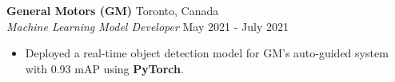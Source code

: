 \documentclass[a4paper]{article}
\begin{document}
\textbf{General Motors (GM)} \hfill Toronto, Canada\\
\textit{Machine Learning Model Developer} \hfill May 2021 - July 2021\\
\vspace{-2.5mm}
\begin{itemize} \itemsep 1pt
	\item Deployed a real-time object detection model for GM's auto-guided system with 0.93 mAP using \textbf{PyTorch}.
    \vspace{-1.5mm}
\end{itemize}

\end{document}
